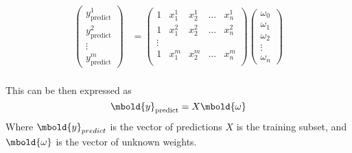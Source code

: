 \documentclass[12pt letter]{report}
\begin{document}
\begin{align*}
  \begin{pmatrix} y^1_{\text{predict}} \\
    y^2_{\text{predict}} \\ \vdots \\  y^m_{\text{predict}}
  \end{pmatrix}                                                      & = \begin{pmatrix}
                                                                           1 & x^1_1 & x^1_2 & \ldots & x^1_n \\
                                                                           1 & x^2_1 & x^2_2 & \ldots & x^2_n \\
                                                                           \vdots                             \\
                                                                           1
                                                                             & x^m_1 & x^m_2 & \ldots & x^m_n \\
                                                                         \end{pmatrix} \begin{pmatrix}
                                                                                         \omega_0 \\
                                                                                         \omega_1 \\
                                                                                         \omega_2 \\
                                                                                         \vdots   \\
                                                                                         \omega_n
                                                                                       \end{pmatrix}                                                                          \\
\end{align*}

This can be then expressed as
\[
  \mbold{y}_{\text{predict}} = X \mbold{\omega}
\]
Where $\mbold{y}_{predict}$ is the vector of predictions $X$ is the training subset, and $\mbold{\omega}$ is the
vector of unknown weights.

\end{document}
